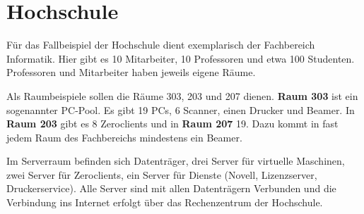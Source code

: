 \section{Hochschule}
Für das Fallbeispiel der Hochschule dient exemplarisch der Fachbereich Informatik. Hier gibt es 10 Mitarbeiter, 10 Professoren und etwa 100 Studenten. Professoren und Mitarbeiter haben jeweils eigene Räume.

Als Raumbeispiele sollen die Räume 303, 203 und 207 dienen.
\textbf{Raum 303} ist ein sogenannter PC-Pool. Es gibt 19 PCs, 6 Scanner, einen Drucker und Beamer. 
In \textbf{Raum 203} gibt es 8 Zeroclients und in \textbf{Raum 207} 19. Dazu kommt in fast jedem Raum des Fachbereichs mindestens ein Beamer.

Im Serverraum befinden sich Datenträger, drei Server für virtuelle Maschinen, zwei Server für Zeroclients, ein Server für Dienste (Novell, Lizenzserver, Druckerservice).
Alle Server sind mit allen Datenträgern Verbunden und die Verbindung ins Internet erfolgt über das Rechenzentrum der Hochschule.
